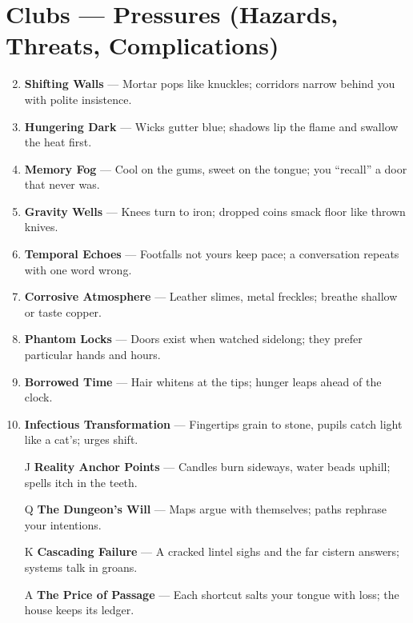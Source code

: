 \section*{Clubs --- Pressures (Hazards, Threats, Complications)}
\label{sec:dungeon-pressures}
\begin{enumerate}
\setcounter{enumi}{1}
\item \textbf{Shifting Walls} — Mortar pops like knuckles; corridors narrow behind you with polite insistence.
\item \textbf{Hungering Dark} — Wicks gutter blue; shadows lip the flame and swallow the heat first.
\item \textbf{Memory Fog} — Cool on the gums, sweet on the tongue; you “recall” a door that never was.
\item \textbf{Gravity Wells} — Knees turn to iron; dropped coins smack floor like thrown knives.
\item \textbf{Temporal Echoes} — Footfalls not yours keep pace; a conversation repeats with one word wrong.
\item \textbf{Corrosive Atmosphere} — Leather slimes, metal freckles; breathe shallow or taste copper.
\item \textbf{Phantom Locks} — Doors exist when watched sidelong; they prefer particular hands and hours.
\item \textbf{Borrowed Time} — Hair whitens at the tips; hunger leaps ahead of the clock.
\item \textbf{Infectious Transformation} — Fingertips grain to stone, pupils catch light like a cat’s; urges shift.
\item[J] \textbf{Reality Anchor Points} — Candles burn sideways, water beads uphill; spells itch in the teeth.
\item[Q] \textbf{The Dungeon’s Will} — Maps argue with themselves; paths rephrase your intentions.
\item[K] \textbf{Cascading Failure} — A cracked lintel sighs and the far cistern answers; systems talk in groans.
\item[A] \textbf{The Price of Passage} — Each shortcut salts your tongue with loss; the house keeps its ledger.
\end{enumerate}

